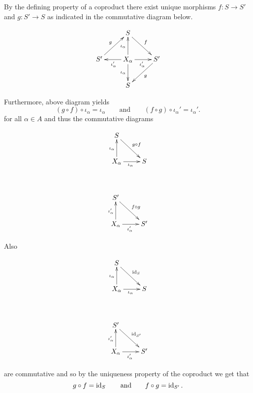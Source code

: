 \begin{solution}
By the defining property of a coproduct there exist unique morphisms $f: S \to S'$ and $g: S' \to S$ as indicated in the commutative diagram below.
\begin{figure}[h!tb]
\begin{displaymath}
    	\xymatrix{ & S \ar[dr]^f\\
    		S' \ar[ur]^g & X_\alpha \ar[l]^{\iota_\alpha'}\ar[u]^{\iota_\alpha}\ar[r]_{\iota_\alpha'}\ar[d]_{\iota_\alpha} & S'\ar[dl]^g\\
    		& S}
\end{displaymath}
\end{figure}
\noindent Furthermore, above diagram yields
\begin{equation*}
(g \circ f) \circ \iota_\alpha = \iota_\alpha \qquad \text{and} \qquad (f \circ g) \circ \iota_\alpha' = \iota_\alpha'.
\end{equation*}
\noindent for all $\alpha \in A$ and thus the commutative diagrams
\begin{figure}[h!tb]
    \centering
    \begin{subfigure}[b]{0.3\textwidth}
        \begin{displaymath}
    			\xymatrix{ S \ar[dr]^{g \circ f}\\
    				X_\alpha \ar[u]^{\iota_\alpha}\ar[r]_{\iota_\alpha} & S }
		\end{displaymath}
    \end{subfigure}
    ~
    \begin{subfigure}[b]{0.3\textwidth}
        \begin{displaymath}
    			\xymatrix{ S' \ar[dr]^{f \circ g}\\
    				X_\alpha \ar[u]^{\iota_\alpha'}\ar[r]_{\iota_\alpha'} & S' }
		\end{displaymath}
    \end{subfigure}
\end{figure}
Also
\begin{figure}[h!tb]
    \centering
    \begin{subfigure}[b]{0.3\textwidth}
        \begin{displaymath}
    			\xymatrix{ S \ar[dr]^{\id_S}\\
    				X_\alpha \ar[u]^{\iota_\alpha}\ar[r]_{\iota_\alpha} & S }
		\end{displaymath}
    \end{subfigure}
    ~
    \begin{subfigure}[b]{0.3\textwidth}
        \begin{displaymath}
    			\xymatrix{ S' \ar[dr]^{\id_{S'}}\\
    				X_\alpha \ar[u]^{\iota_\alpha'}\ar[r]_{\iota_\alpha'} & S' }
		\end{displaymath}
    \end{subfigure}
\end{figure}
\noindent are commutative and so by the uniqueness property of the coproduct we get that 
\begin{equation*}
g \circ f = \operatorname{id}_S \qquad \text{and} \qquad f \circ g = \operatorname{id}_{S'}.
\end{equation*}
\end{solution}
